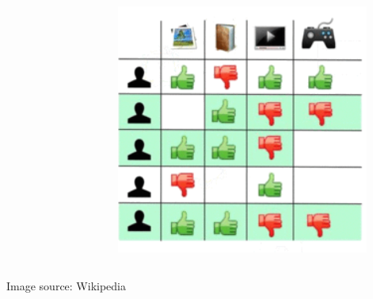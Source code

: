 \documentclass[11pt,aspectratio=169]{beamer}
\makeatletter
\def\tikzscale{1}\begin{lrbox}{\measure@tikzpicture}%
\edef\tikzscale{\pgfmathresult}%
\makeatother
\begin{document}
\begin{frame}
\begin{columns}
\begin{column}{0.3\textwidth}
			\end{column}\pause
			\begin{column}{0.05\textwidth}
				\begin{scaletikzpicturetowidth}{\textwidth}
				\end{scaletikzpicturetowidth}
			\end{column}
			\begin{column}{0.3\textwidth}
				\includegraphics[width=\textwidth]{images/cf-stage3.png}
			\end{column}
		\end{columns}
		\begin{center}
			\centering
			{\tiny Image source: Wikipedia}
		\end{center}
	\end{frame}
\end{document}
